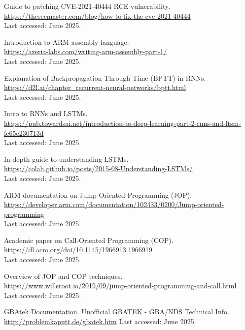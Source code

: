\documentclass[a4paper]{usiinfbachelorproject}
\begin{document}
\begin{thebibliography}{99}
	Guide to patching CVE-2021-40444 RCE vulnerability.\\
	\url{https://thesecmaster.com/blog/how-to-fix-the-cve-2021-40444}\\
	Last accessed: June 2025.


	Introduction to ARM assembly language.\\
	\url{https://azeria-labs.com/writing-arm-assembly-part-1/}\\
	Last accessed: June 2025.


	Explanation of Backpropagation Through Time (BPTT) in RNNs.\\
	\url{https://d2l.ai/chapter_recurrent-neural-networks/bptt.html}\\
	Last accessed: June 2025.


	Intro to RNNs and LSTMs.\\
	\url{https://pub.towardsai.net/introduction-to-deep-learning-part-2-rnns-and-ltsm-fc65c230713d}\\
	Last accessed: June 2025.


	In-depth guide to understanding LSTMs.\\
	\url{https://colah.github.io/posts/2015-08-Understanding-LSTMs/}\\
	Last accessed: June 2025.


	ARM documentation on Jump-Oriented Programming (JOP).\\
	\url{https://developer.arm.com/documentation/102433/0200/Jump-oriented-programming}\\
	Last accessed: June 2025.


	Academic paper on Call-Oriented Programming (COP).\\
	\url{https://dl.acm.org/doi/10.1145/1966913.1966919}\\
	Last accessed: June 2025.


	Overview of JOP and COP techniques.\\
	\url{https://www.willsroot.io/2019/09/jump-oriented-programming-and-call.html}\\
	Last accessed: June 2025.

	GBAtek Documentation.
	Unofficial GBATEK - GBA/NDS Technical Info.
	\url{http://problemkaputt.de/gbatek.htm}
	Last accessed: June 2025.


\end{thebibliography}
\end{document}
